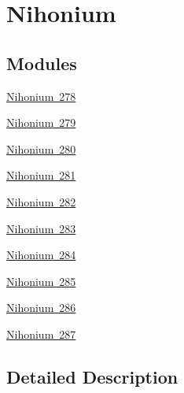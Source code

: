 \hypertarget{group___isotope_const-_nihonium}{}\section{Nihonium}
\label{group___isotope_const-_nihonium}
\subsection*{Modules}
\begin{DoxyCompactItemize}
\item 
\mbox{\hyperlink{group___isotope_const-_nihonium-_nh278}{Nihonium 278}}
\item 
\mbox{\hyperlink{group___isotope_const-_nihonium-_nh279}{Nihonium 279}}
\item 
\mbox{\hyperlink{group___isotope_const-_nihonium-_nh280}{Nihonium 280}}
\item 
\mbox{\hyperlink{group___isotope_const-_nihonium-_nh281}{Nihonium 281}}
\item 
\mbox{\hyperlink{group___isotope_const-_nihonium-_nh282}{Nihonium 282}}
\item 
\mbox{\hyperlink{group___isotope_const-_nihonium-_nh283}{Nihonium 283}}
\item 
\mbox{\hyperlink{group___isotope_const-_nihonium-_nh284}{Nihonium 284}}
\item 
\mbox{\hyperlink{group___isotope_const-_nihonium-_nh285}{Nihonium 285}}
\item 
\mbox{\hyperlink{group___isotope_const-_nihonium-_nh286}{Nihonium 286}}
\item 
\mbox{\hyperlink{group___isotope_const-_nihonium-_nh287}{Nihonium 287}}
\end{DoxyCompactItemize}


\subsection{Detailed Description}
